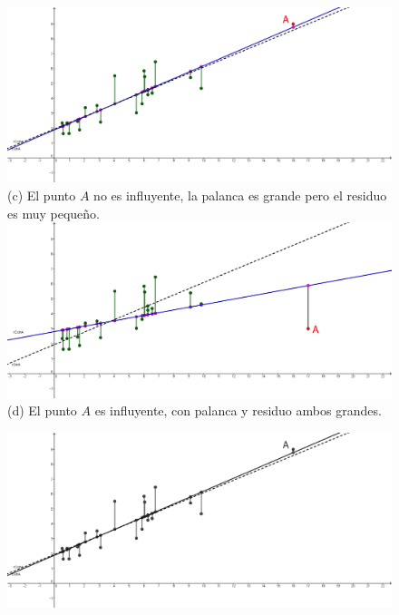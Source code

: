 \begin{figure}[p]
\begin{center}
\begin{enColor}
\includegraphics[width=13cm]{../fig/Cap10-PuntosInfluyentesRegresion-04.png}\\[3mm]
(c) El punto $A$ no es influyente, la palanca es grande pero el residuo es muy peque\~no.\\[7mm]
\includegraphics[width=13cm]{../fig/Cap10-PuntosInfluyentesRegresion-03.png}\\[3mm]
(d) El punto $A$ es influyente, con palanca y residuo ambos grandes.\\[3mm]
\end{enColor}
\begin{bn}
\includegraphics[width=13cm]{../fig/Cap10-PuntosInfluyentesRegresion-04-bn.png}\\[3mm]

\end{bn}
\end{center}
\end{figure}
